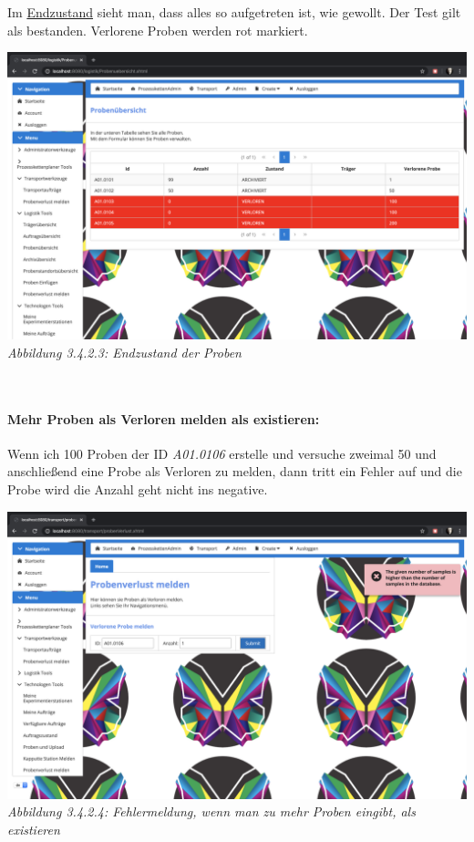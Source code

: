 \documentclass[enabledeprecatedfontcommands,fontsize=12pt,paper=a4,twoside]{scrartcl}
\begin{document}
Im \hyperlink{sc3.4.2.3}{Endzustand} sieht man, dass alles so aufgetreten ist, wie gewollt. Der Test gilt als bestanden. Verlorene Proben werden rot markiert.

\hypertarget{sc3.4.2.3}{
\includegraphics[width=1\textwidth]{Screenshots/3423.png}
\textit{Abbildung 3.4.2.3: Endzustand der Proben}
} \\

\paragraph{Mehr Proben als Verloren melden als existieren:}

Wenn ich 100 Proben der ID \textit{A01.0106} erstelle und versuche zweimal 50 und anschließend eine Probe als Verloren zu melden, dann tritt ein Fehler auf und die Probe wird die Anzahl geht nicht ins negative. 

\hypertarget{sc3.4.2.4}{
\includegraphics[width=1\textwidth]{Screenshots/3424.png}
\textit{Abbildung 3.4.2.4: Fehlermeldung, wenn man zu mehr Proben eingibt, als existieren}
} \\
\end{document}
